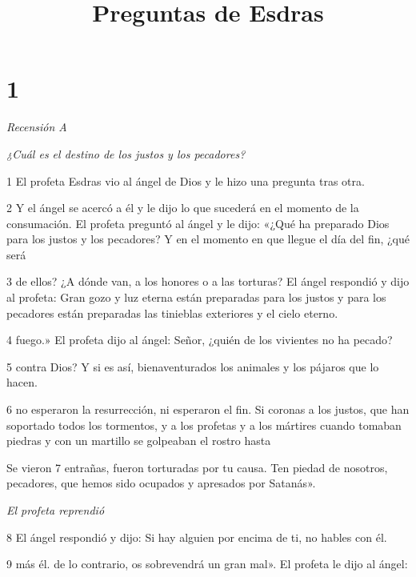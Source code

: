 

\title{Preguntas de Esdras}

\chapter{1}

\par \textit{Recensión A}

\par \textit{¿Cuál es el destino de los justos y los pecadores?}

\par 1 El profeta Esdras vio al ángel de Dios y le hizo una pregunta tras otra.

\par 2 Y el ángel se acercó a él y le dijo lo que sucederá en el momento de la consumación. El profeta preguntó al ángel y le dijo: «¿Qué ha preparado Dios para los justos y los pecadores? Y en el momento en que llegue el día del fin, ¿qué será

\par 3 de ellos? ¿A dónde van, a los honores o a las torturas? El ángel respondió y dijo al profeta: Gran gozo y luz eterna están preparadas para los justos y para los pecadores están preparadas las tinieblas exteriores y el cielo eterno.

\par 4 fuego.» El profeta dijo al ángel: Señor, ¿quién de los vivientes no ha pecado?

\par 5 contra Dios? Y si es así, bienaventurados los animales y los pájaros que lo hacen.

\par 6 no esperaron la resurrección, ni esperaron el fin. Si coronas a los justos, que han soportado todos los tormentos, y a los profetas y a los mártires cuando tomaban piedras y con un martillo se golpeaban el rostro hasta

\par Se vieron 7 entrañas, fueron torturadas por tu causa. Ten piedad de nosotros, pecadores, que hemos sido ocupados y apresados ​​por Satanás».

\par \textit{El profeta reprendió}

\par 8 El ángel respondió y dijo: Si hay alguien por encima de ti, no hables con él.

\par 9 más él. de lo contrario, os sobrevendrá un gran mal». El profeta le dijo al ángel:

